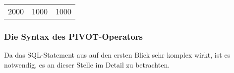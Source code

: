 \begin{center}
    \begin{small}
        \tablehead{}

        \begin{mssql}
            \begin{supertabular}{lll}
                2000 & 1000 & 1000 \\
            \end{supertabular}
        \end{mssql}
    \end{small}
\end{center}
\subsubsection{Die Syntax des PIVOT-Operators}
Da das SQL-Statement aus  auf den ersten Blick sehr komplex wirkt, ist es notwendig, es an dieser Stelle im Detail zu betrachten.

